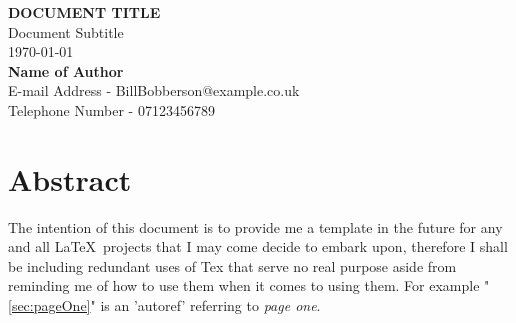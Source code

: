 \begin{titlepage}
	\vspace*{\fill}

	\begin{center}
		{\huge{\textbf{DOCUMENT TITLE}}} \\
		\Large{Document Subtitle} \\
		\vspace{1cm}
		\Large{\today} \\
		\vspace{1cm}
		\Large{\textbf{Name of Author}} \\
		\Large{E-mail Address - BillBobberson@example.co.uk} \\
		\Large{Telephone Number - 07123456789} \\
		\vspace*{\fill}
		\pagebreak
	\end{center}

	\vspace*{\fill}

	\section*{Abstract}

	\normalsize{The} intention of this document is to provide me a template in the future for any and all \LaTeX\  projects that I may come decide to embark upon, therefore I shall be including redundant uses of Tex that serve no real purpose aside from reminding me of how to use them when it comes to using them. For example "\autoref{sec:pageOne}" is an 'autoref' referring to \textit{page one}. \newline

	\vspace*{\fill}
\end{titlepage}

\pagebreak
\tableofcontents
\listoffigures
\listoftables
